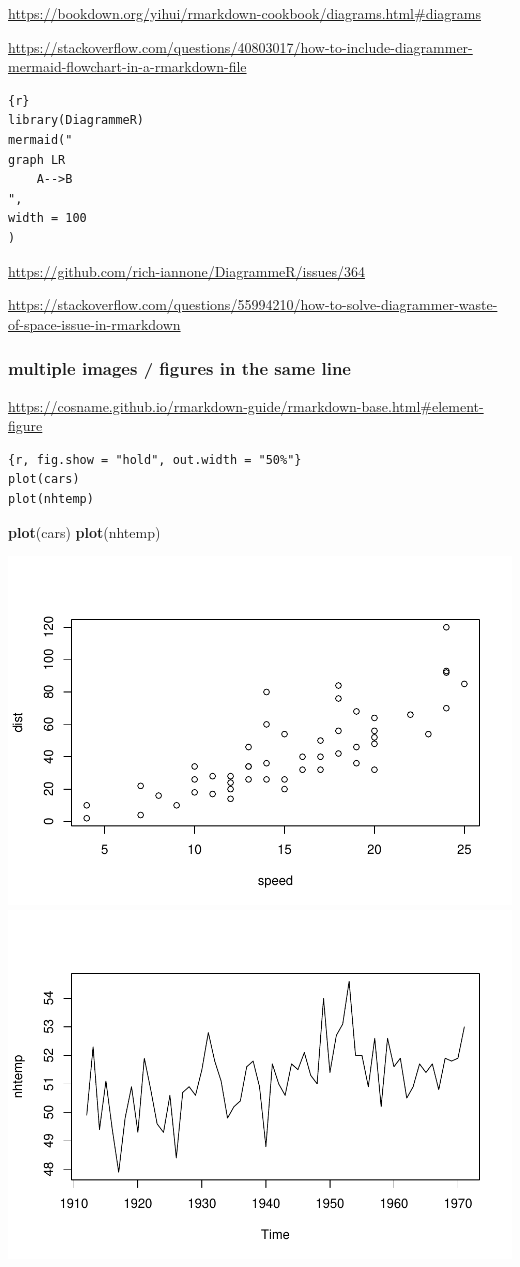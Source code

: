 \documentclass[
]{book}
\newenvironment{Shaded}{\begin{snugshade}}{\end{snugshade}}
\newcommand{\FunctionTok}[1]{\textcolor[rgb]{0.13,0.29,0.53}{\textbf{#1}}}
\newcommand{\NormalTok}[1]{#1}
\theoremstyle{definition}
\theoremstyle{definition}
\theoremstyle{definition}
\theoremstyle{definition}
\theoremstyle{remark}
\begin{document}
\url{https://bookdown.org/yihui/rmarkdown-cookbook/diagrams.html\#diagrams}

\url{https://stackoverflow.com/questions/40803017/how-to-include-diagrammer-mermaid-flowchart-in-a-rmarkdown-file}

\begin{verbatim}
{r}
library(DiagrammeR)
mermaid("
graph LR
    A-->B
",
width = 100
)
\end{verbatim}

\url{https://github.com/rich-iannone/DiagrammeR/issues/364}

\url{https://stackoverflow.com/questions/55994210/how-to-solve-diagrammer-waste-of-space-issue-in-rmarkdown}

\hypertarget{multiple-images-figures-in-the-same-line}{%
\subsubsection{multiple images / figures in the same line}\label{multiple-images-figures-in-the-same-line}}

\url{https://cosname.github.io/rmarkdown-guide/rmarkdown-base.html\#element-figure}

\begin{verbatim}
{r, fig.show = "hold", out.width = "50%"}
plot(cars)
plot(nhtemp)
\end{verbatim}

\begin{Shaded}
\begin{Highlighting}[]
\FunctionTok{plot}\NormalTok{(cars)}
\FunctionTok{plot}\NormalTok{(nhtemp)}
\end{Highlighting}
\end{Shaded}

\includegraphics[width=0.5\linewidth]{202401280001-test_files/figure-latex/unnamed-chunk-4-1} \includegraphics[width=0.5\linewidth]{202401280001-test_files/figure-latex/unnamed-chunk-4-2}
\end{document}
